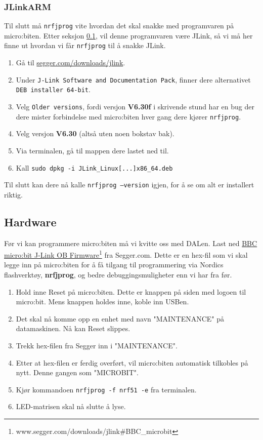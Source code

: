 \documentclass[11pt,a4paper]{article}
\begin{document}
\subsubsection{JLinkARM}
Til slutt må \texttt{nrfjprog} vite hvordan det skal snakke med programvaren på micro:biten. Etter seksjon \ref{sec::setup::hardware}, vil denne programvaren være JLink, så vi må her finne ut hvordan vi får \texttt{nrfjprog} til å snakke JLink.
\begin{enumerate}
\item Gå til \href{segger.com/downloads/jlink}{segger.com/downloads/jlink}.
\item Under \texttt{J-Link Software and Documentation Pack}, finner dere alternativet \texttt{DEB installer 64-bit}.
\item Velg \texttt{Older versions}, fordi versjon \textbf{V6.30f} i skrivende stund har en bug der dere mister forbindelse med micro:biten hver gang dere kjører \texttt{nrfjprog}.
\item Velg versjon \textbf{V6.30} (altså uten noen bokstav bak).
\item Via terminalen, gå til mappen dere lastet ned til.
\item Kall \texttt{sudo dpkg -i JLink_Linux[...]x86_64.deb}
\end{enumerate}
Til slutt kan dere nå kalle \texttt{nrfjprog --version} igjen, for å se om alt er installert riktig.

\subsection{Hardware}
\label{sec::setup::hardware}
Før vi kan programmere micro:biten må vi kvitte oss med DALen. Last ned \href{https://www.segger.com/downloads/jlink\#BBC_microbit}{BBC micro:bit J-Link OB Firmware}\footnote{www.segger.com/downloads/jlink\#BBC\_microbit} fra Segger.com. Dette er en hex-fil som vi skal legge inn på micro:biten for å få tilgang til programmering via Nordics flashverktøy, \textbf{nrfjprog}, og bedre debuggingsmuligheter enn vi har fra før.

\begin{enumerate}
\item Hold inne Reset på micro:biten. Dette er knappen på siden med logoen til micro:bit. Mens knappen holdes inne, koble inn USBen.
\item Det skal nå komme opp en enhet med navn "MAINTENANCE" på datamaskinen. Nå kan Reset slippes.
\item Trekk hex-filen fra Segger inn i "MAINTENANCE".
\item Etter at hex-filen er ferdig overført, vil micro:biten automatisk tilkobles på nytt. Denne gangen som "MICROBIT".
\item Kjør kommandoen \texttt{nrfjprog -f nrf51 -e} fra terminalen.
\item LED-matrisen skal nå slutte å lyse.
\end{enumerate}
\end{document}
